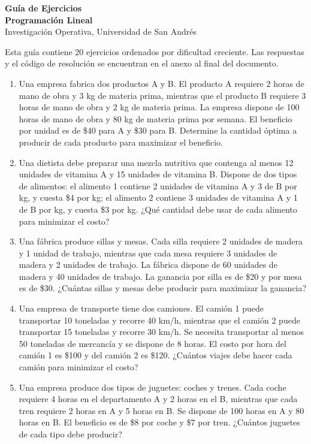 \documentclass[12pt]{article}
\begin{document}
\begin{center}
    {\LARGE \textbf{Guía de Ejercicios \\Programación Lineal}}\\[0.5em]
    {Investigación Operativa, Universidad de San Andrés}
\end{center}

Esta guía contiene 20 ejercicios ordenados por dificultad creciente. Las respuestas y el código de resolución se encuentran en el anexo al final del documento.

\begin{enumerate}

\item Una empresa fabrica dos productos A y B. El producto A requiere 2 horas de mano de obra y 3 kg de materia prima, mientras que el producto B requiere 3 horas de mano de obra y 2 kg de materia prima. La empresa dispone de 100 horas de mano de obra y 80 kg de materia prima por semana. El beneficio por unidad es de \$40 para A y \$30 para B. Determine la cantidad óptima a producir de cada producto para maximizar el beneficio.

\item Una dietista debe preparar una mezcla nutritiva que contenga al menos 12 unidades de vitamina A y 15 unidades de vitamina B. Dispone de dos tipos de alimentos: el alimento 1 contiene 2 unidades de vitamina A y 3 de B por kg, y cuesta \$4 por kg; el alimento 2 contiene 3 unidades de vitamina A y 1 de B por kg, y cuesta \$3 por kg. ¿Qué cantidad debe usar de cada alimento para minimizar el costo?

\item Una fábrica produce sillas y mesas. Cada silla requiere 2 unidades de madera y 1 unidad de trabajo, mientras que cada mesa requiere 3 unidades de madera y 2 unidades de trabajo. La fábrica dispone de 60 unidades de madera y 40 unidades de trabajo. La ganancia por silla es de \$20 y por mesa es de \$30. ¿Cuántas sillas y mesas debe producir para maximizar la ganancia?

\item Una empresa de transporte tiene dos camiones. El camión 1 puede transportar 10 toneladas y recorre 40 km/h, mientras que el camión 2 puede transportar 15 toneladas y recorre 30 km/h. Se necesita transportar al menos 50 toneladas de mercancía y se dispone de 8 horas. El costo por hora del camión 1 es \$100 y del camión 2 es \$120. ¿Cuántos viajes debe hacer cada camión para minimizar el costo?

\item Una empresa produce dos tipos de juguetes: coches y trenes. Cada coche requiere 4 horas en el departamento A y 2 horas en el B, mientras que cada tren requiere 2 horas en A y 5 horas en B. Se dispone de 100 horas en A y 80 horas en B. El beneficio es de \$8 por coche y \$7 por tren. ¿Cuántos juguetes de cada tipo debe producir?


\end{enumerate}
\end{document}
